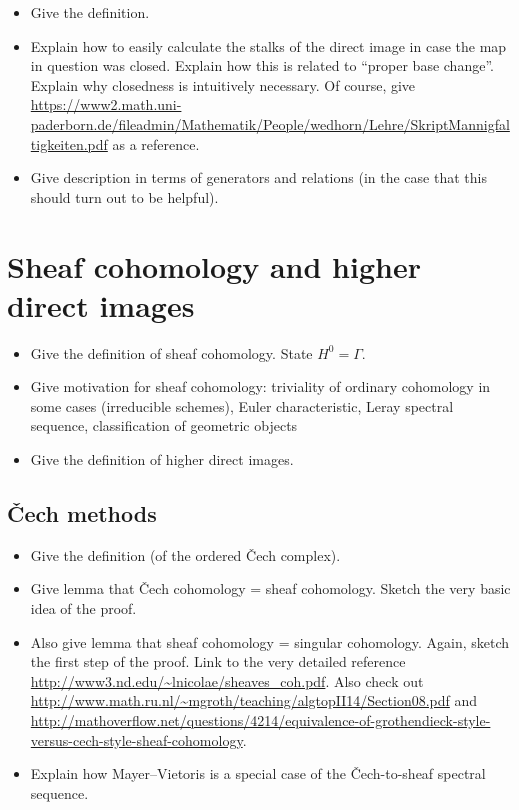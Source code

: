 \documentclass[10pt]{amsart}
\theoremstyle{definition}
\theoremstyle{plain}
\theoremstyle{remark}
\begin{document}
\begin{itemize}
\item Give the definition.
\item Explain how to easily calculate the stalks of the direct image in case
the map in question was closed. Explain how this is related to ``proper base
change''. Explain why closedness is intuitively necessary. Of course, give
\url{https://www2.math.uni-paderborn.de/fileadmin/Mathematik/People/wedhorn/Lehre/SkriptMannigfaltigkeiten.pdf}
as a reference.
\item Give description in terms of generators and relations (in the case that
this should turn out to be helpful).
\end{itemize}


\section{Sheaf cohomology and higher direct images}

\begin{itemize}
\item Give the definition of sheaf cohomology. State $H^0 = \Gamma$.
\item Give motivation for sheaf cohomology: triviality of ordinary cohomology
in some cases (irreducible schemes), Euler characteristic, Leray spectral
sequence, classification of geometric objects
\item Give the definition of higher direct images.
\end{itemize}


\subsection{Čech methods}

\begin{itemize}
\item Give the definition (of the ordered Čech complex).
\item Give lemma that Čech cohomology = sheaf cohomology. Sketch the very basic
idea of the proof.
\item Also give lemma that sheaf cohomology = singular cohomology. Again,
sketch the first step of the proof. Link to the very detailed reference
\url{http://www3.nd.edu/~lnicolae/sheaves_coh.pdf}. Also check out
\url{http://www.math.ru.nl/~mgroth/teaching/algtopII14/Section08.pdf} and
\url{http://mathoverflow.net/questions/4214/equivalence-of-grothendieck-style-versus-cech-style-sheaf-cohomology}.
\item Explain how Mayer--Vietoris is a special case of the Čech-to-sheaf
spectral sequence.
\end{itemize}
\end{document}
